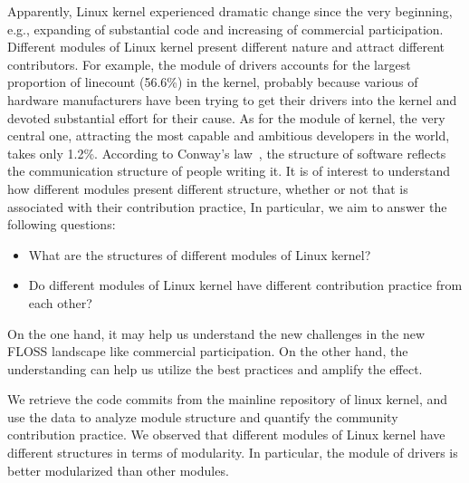 \documentclass{sig-alternate-05-2015}
\begin{document}
Apparently, Linux kernel experienced dramatic change since the very
beginning, e.g., expanding of substantial code and increasing of commercial participation.
Different modules of Linux kernel present different nature
and attract different contributors. For example, the module of drivers
accounts for the largest proportion of linecount (56.6\%) in the kernel,
probably because various of
hardware manufacturers have been trying to get their drivers into the kernel
and devoted substantial effort for their cause.
 As for the module of kernel, the very central one, attracting the most
capable and ambitious developers in the world, takes only 1.2\%.
According to Conway's law~\cite{conway}, the structure of software reflects
the communication structure of people writing it.
It is of interest to understand how different modules present different
structure, whether or not that is associated with their contribution practice,
In particular, we aim to answer the following questions:
\begin{itemize}
\item What are the structures of different modules of Linux kernel?
\item Do different modules of Linux kernel have different contribution practice from each other?

\end{itemize}
On the one hand,
it may help us understand the new challenges in the new FLOSS landscape like
commercial participation. %
On the other hand, the understanding can help us
utilize the best practices and amplify the effect.


We retrieve the code commits from the mainline repository of linux kernel, and
use the data to analyze module structure and quantify the community contribution practice.
We observed that different modules of Linux kernel have different structures in terms of modularity.
In particular, the module of drivers is better modularized than other modules.
\end{document}
